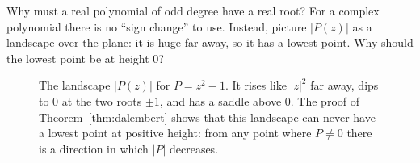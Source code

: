 \begin{think}
Why must a real polynomial of odd degree have a real root? For a complex polynomial there is no ``sign change'' to use. Instead, picture $|P(z)|$ as a landscape over the plane: it is huge far away, so it has a lowest point. Why should the lowest point be at height $0$?
\end{think}

\begin{figure}[ht]
\centering
{}
\caption{The landscape $|P(z)|$ for $P=z^2-1$. It rises like $|z|^2$ far away, dips to $0$ at the two roots $\pm1$, and has a saddle above $0$. The proof of Theorem~\ref{thm:dalembert} shows that this landscape can never have a lowest point at positive height: from any point where $P\ne0$ there is a direction in which $|P|$ decreases.}
\label{fig:landscape}
\end{figure}


